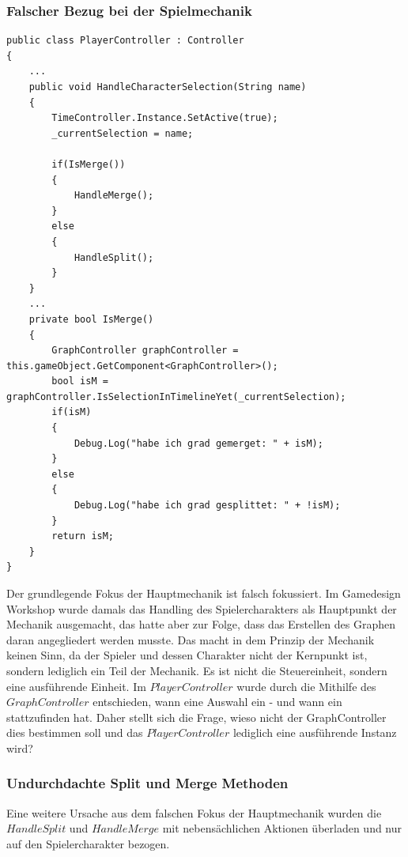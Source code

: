 \subsubsection{Falscher Bezug bei der Spielmechanik}
\begin{lstlisting}[caption={HandleCharacterSelection im PlayerController Skript}, label={sec:playercontroller_old}]
public class PlayerController : Controller
{
    ...
    public void HandleCharacterSelection(String name)
    {
        TimeController.Instance.SetActive(true);
        _currentSelection = name;
        
        if(IsMerge())
        {
            HandleMerge();
        }
        else
        {
            HandleSplit();
        }
    }
    ...
    private bool IsMerge()
    {
        GraphController graphController = this.gameObject.GetComponent<GraphController>();
        bool isM = graphController.IsSelectionInTimelineYet(_currentSelection);
        if(isM)
        {   
            Debug.Log("habe ich grad gemerget: " + isM);
        }
        else
        {
            Debug.Log("habe ich grad gesplittet: " + !isM);
        }
        return isM;
    }
}
\end{lstlisting}
Der grundlegende Fokus der Hauptmechanik ist falsch fokussiert. Im Gamedesign Workshop wurde damals das Handling des Spielercharakters als Hauptpunkt der Mechanik ausgemacht, das hatte aber zur Folge, dass das Erstellen des Graphen daran angegliedert werden musste. Das macht in dem Prinzip der Mechanik keinen Sinn, da der Spieler und dessen Charakter nicht der Kernpunkt ist, sondern lediglich ein Teil der Mechanik. Es ist nicht die Steuereinheit, sondern eine ausführende Einheit. Im $PlayerController$ wurde durch die Mithilfe des $GraphController$ entschieden, wann eine Auswahl ein - und wann ein  stattzufinden hat. Daher stellt sich die Frage, wieso nicht der GraphController dies bestimmen soll und das $PlayerController$ lediglich eine ausführende Instanz wird?

\subsubsection{Undurchdachte Split und Merge Methoden}
Eine weitere Ursache aus dem falschen Fokus der Hauptmechanik wurden die\\ $HandleSplit$ und $HandleMerge$ mit nebensächlichen Aktionen überladen und nur auf den Spielercharakter bezogen.

